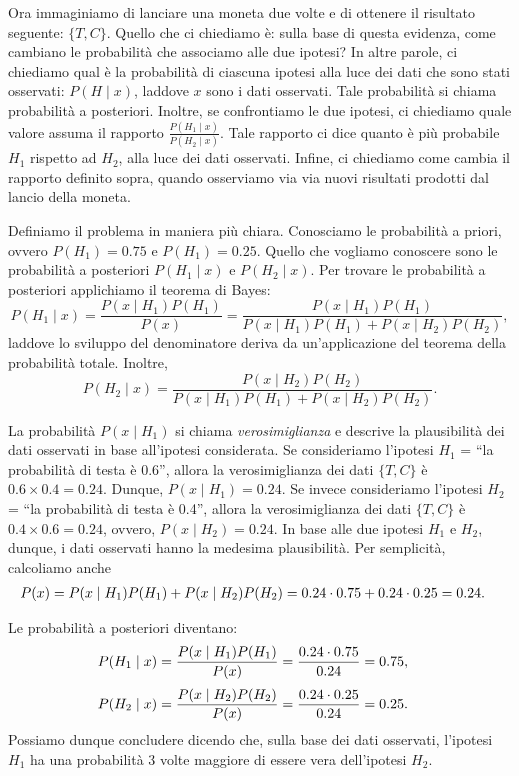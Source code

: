 Ora immaginiamo di lanciare una moneta due volte e di ottenere il risultato seguente: $\{T, C\}$.
Quello che ci chiediamo è: sulla base di questa evidenza, come cambiano le probabilità che associamo alle due ipotesi?
In altre parole, ci chiediamo qual è la probabilità di ciascuna ipotesi alla luce dei dati che sono stati osservati: $P(H \mid x)$, laddove $x$ sono i dati osservati.
Tale probabilità si chiama probabilità a posteriori.
Inoltre, se confrontiamo le due ipotesi, ci chiediamo quale valore assuma il rapporto $\frac{P(H_1 \mid x)}{P(H_2 \mid x)}$.
Tale rapporto ci dice quanto è più probabile $H_1$ rispetto ad $H_2$, alla luce dei dati osservati.
Infine, ci chiediamo come cambia il rapporto definito sopra, quando osserviamo via via nuovi risultati prodotti dal lancio della moneta.

Definiamo il problema in maniera più chiara.
Conosciamo le probabilità a priori, ovvero $P(H_1) = 0.75$ e $P(H_1) = 0.25$. 
Quello che vogliamo conoscere sono le probabilità a posteriori $P(H_1 \mid x)$ e $P(H_2 \mid x)$.
Per trovare le probabilità a posteriori applichiamo il teorema di Bayes:
\[
P(H_1 \mid x) = \frac{P(x \mid H_1) P(H_1)}{P(x)} = 
\frac{P(x \mid H_1) P(H_1)}{P(x \mid H_1) P(H_1) + P(x \mid H_2) P(H_2)},
\]
laddove lo sviluppo del denominatore deriva da un'applicazione del teorema della probabilità totale.
Inoltre, 
\[
P(H_2 \mid x) = 
\frac{P(x \mid H_2) P(H_2)}{P(x \mid H_1) P(H_1) + P(x \mid H_2) P(H_2)}.
\]

La probabilità $P(x \mid H_1)$ si chiama \emph{verosimiglianza} e descrive la plausibilità dei dati osservati in base all'ipotesi considerata.
Se consideriamo l'ipotesi $H_1$ = \enquote{la probabilità di testa è 0.6}, allora la verosimiglianza dei dati $\{T, C\}$ è
$
0.6 \times 0.4 = 0.24.
$
Dunque, $P(x \mid H_1) = 0.24$. Se invece consideriamo l'ipotesi $H_2$ = \enquote{la probabilità di testa è 0.4}, allora la verosimiglianza dei dati $\{T, C\}$ è
$
0.4 \times 0.6 = 0.24
$,
ovvero, $P(x \mid H_2) = 0.24$.
In base alle due ipotesi $H_1$ e $H_2$, dunque, i dati osservati hanno la medesima plausibilità.
Per semplicità, calcoliamo anche 
\begin{align}
P(x) &= P(x \mid H_1) P(H_1) + P(x \mid H_2) P(H_2) = 0.24 \cdot 0.75 + 0.24 \cdot 0.25 = 0.24.\notag
\end{align}

Le probabilità a posteriori diventano:
\begin{align}
P(H_1 \mid x) &= \frac{P(x \mid H_1) P(H_1)}{P(x)} = \frac{0.24 \cdot 0.75}{0.24} = 0.75,\notag
\end{align}
\begin{align}
P(H_2 \mid x) &= \frac{P(x \mid H_2) P(H_2)}{P(x)} = \frac{0.24 \cdot 0.25}{0.24} = 0.25.\notag
\end{align}
Possiamo dunque concludere dicendo che, sulla base dei dati osservati, l'ipotesi $H_1$ ha una probabilità 3 volte maggiore di essere vera dell'ipotesi $H_2$.

